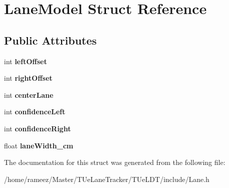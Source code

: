 \hypertarget{structLaneModel}{\section{Lane\-Model Struct Reference}
\label{structLaneModel}
}
\subsection*{Public Attributes}
\begin{DoxyCompactItemize}
\item 
\hypertarget{structLaneModel_a93d8b45a688c5bd1829f8206dbdf3442}{int {\bfseries left\-Offset}}\label{structLaneModel_a93d8b45a688c5bd1829f8206dbdf3442}

\item 
\hypertarget{structLaneModel_aeb4b4fee6ff618758ce9f5460034a92c}{int {\bfseries right\-Offset}}\label{structLaneModel_aeb4b4fee6ff618758ce9f5460034a92c}

\item 
\hypertarget{structLaneModel_a6de5cb6e6d6677fee8b8e04e1b47964d}{int {\bfseries center\-Lane}}\label{structLaneModel_a6de5cb6e6d6677fee8b8e04e1b47964d}

\item 
\hypertarget{structLaneModel_ae2c26385b345477a2c9bb0eac120efb9}{int {\bfseries confidence\-Left}}\label{structLaneModel_ae2c26385b345477a2c9bb0eac120efb9}

\item 
\hypertarget{structLaneModel_a5faed89e31aa1883f1632f39050081e4}{int {\bfseries confidence\-Right}}\label{structLaneModel_a5faed89e31aa1883f1632f39050081e4}

\item 
\hypertarget{structLaneModel_a4e465e5eb215ef2040a93b0c6e253959}{float {\bfseries lane\-Width\-\_\-cm}}\label{structLaneModel_a4e465e5eb215ef2040a93b0c6e253959}

\end{DoxyCompactItemize}


The documentation for this struct was generated from the following file\-:\begin{DoxyCompactItemize}
\item 
/home/rameez/\-Master/\-T\-Ue\-Lane\-Tracker/\-T\-Ue\-L\-D\-T/include/Lane.\-h\end{DoxyCompactItemize}

